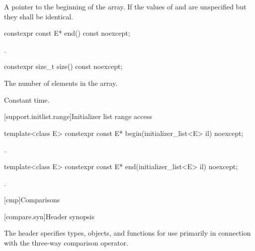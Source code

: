 \begin{itemdescr}
\pnum
\returns
A pointer to the beginning of the array. If  the
values of  and  are unspecified but they shall be
identical.
\end{itemdescr}

%
\begin{itemdecl}
constexpr const E* end() const noexcept;
\end{itemdecl}

\begin{itemdescr}
\pnum
\returns
{}.
\end{itemdescr}

%
\begin{itemdecl}
constexpr size_t size() const noexcept;
\end{itemdecl}

\begin{itemdescr}
\pnum
\returns
The number of elements in the array.

\pnum
\complexity
Constant time.
\end{itemdescr}

[support.initlist.range]{Initializer list range access}

%
\begin{itemdecl}
template<class E> constexpr const E* begin(initializer_list<E> il) noexcept;
\end{itemdecl}

\begin{itemdescr}
\pnum
\returns
{}.
\end{itemdescr}

%
\begin{itemdecl}
template<class E> constexpr const E* end(initializer_list<E> il) noexcept;
\end{itemdecl}

\begin{itemdescr}
\pnum
\returns
{}.
\end{itemdescr}

[cmp]{Comparisons}

[compare.syn]{Header  synopsis}

\pnum
The header  specifies types, objects, and functions
for use primarily in connection with
the three-way comparison operator.

